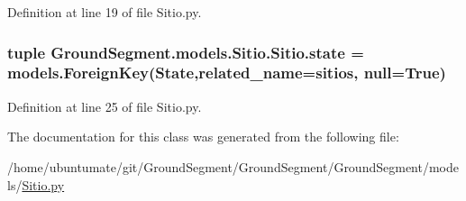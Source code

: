 Definition at line 19 of file Sitio.\+py.

\hypertarget{class_ground_segment_1_1models_1_1_sitio_1_1_sitio_a2322dc336db534f7eec708e7e17b732f}{}
\subsubsection[{state}]{\setlength{\rightskip}{0pt plus 5cm}tuple Ground\+Segment.\+models.\+Sitio.\+Sitio.\+state = models.\+Foreign\+Key({\bf State},related\+\_\+name=\textquotesingle{}sitios\textquotesingle{}, null=True)\hspace{0.3cm}{\ttfamily [static]}}\label{class_ground_segment_1_1models_1_1_sitio_1_1_sitio_a2322dc336db534f7eec708e7e17b732f}


Definition at line 25 of file Sitio.\+py.



The documentation for this class was generated from the following file\+:\begin{DoxyCompactItemize}
\item 
/home/ubuntumate/git/\+Ground\+Segment/\+Ground\+Segment/\+Ground\+Segment/models/\hyperlink{_sitio_8py}{Sitio.\+py}\end{DoxyCompactItemize}
